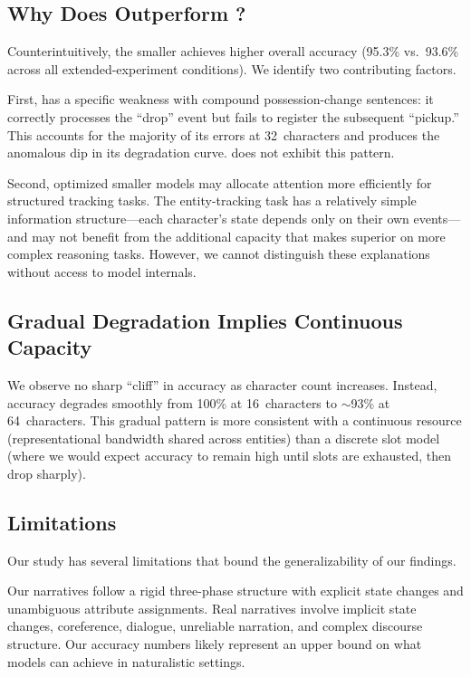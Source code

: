 \subsection{Why Does \gptmini Outperform \gptfull?}

Counterintuitively, the smaller \gptmini achieves higher overall accuracy (95.3\% vs.\ 93.6\% across all extended-experiment conditions).
We identify two contributing factors.

First, \gptfull has a specific weakness with compound possession-change sentences: it correctly processes the ``drop'' event but fails to register the subsequent ``pickup.''
This accounts for the majority of its errors at 32~characters and produces the anomalous dip in its degradation curve.
\gptmini does not exhibit this pattern.

Second, optimized smaller models may allocate attention more efficiently for structured tracking tasks.
The entity-tracking task has a relatively simple information structure---each character's state depends only on their own events---and may not benefit from the additional capacity that makes \gptfull superior on more complex reasoning tasks.
However, we cannot distinguish these explanations without access to model internals.

\subsection{Gradual Degradation Implies Continuous Capacity}

We observe no sharp ``cliff'' in accuracy as character count increases.
Instead, accuracy degrades smoothly from 100\% at 16~characters to $\sim$93\% at 64~characters.
This gradual pattern is more consistent with a continuous resource (representational bandwidth shared across entities) than a discrete slot model (where we would expect accuracy to remain high until slots are exhausted, then drop sharply).

\subsection{Limitations}

Our study has several limitations that bound the generalizability of our findings.

Our narratives follow a rigid three-phase structure with explicit state changes and unambiguous attribute assignments.
Real narratives involve implicit state changes, coreference, dialogue, unreliable narration, and complex discourse structure.
Our accuracy numbers likely represent an upper bound on what models can achieve in naturalistic settings.

